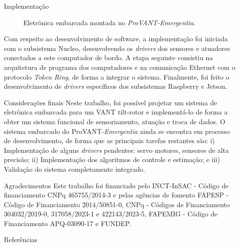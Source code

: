 \documentclass[final,20pt]{beamer}
\newlength{\sepwidth}
\newlength{\colwidth}
\newcommand{\separatorcolumn}{\begin{column}{\sepwidth}\end{column}}
\begin{document}
\begin{frame}[t]
\begin{columns}[t]
\begin{column}{\colwidth}
\begin{block}{Implementação}
\begin{figure}
        \caption{Eletrônica embarcada montada no \textit{ProVANT-Emergentia}.}
        \label{fig:vant4}
    \end{figure}

    Com respeito ao desenvolvimento de software, a implementação foi iniciada com o subsistema Nucleo, desenvolvendo os \textit{drivers} dos sensores e atuadores conectados a este computador de bordo. A etapa seguinte consistiu na arquitetura de programa dos computadores e na comunicação Ethernet com o protocolo \textit{Token Ring}, de forma a integrar o sistema. Finalmente, foi feito o desenvolvimento de \textit{drivers} específicos dos subsistemas Raspberry e Jetson.

  \end{block}
\vspace{-1em}
  \begin{block}{Considerações finais}
   Neste trabalho, foi possível projetar um sistema de eletrônica embarcada para um VANT tilt-rotor e implementá-lo de forma a obter um sistema funcional de sensoriamento, atuação e troca de dados. O sistema embarcado do ProVANT-\textit{Emergentia} ainda se encontra em processo de desenvolvimento, de forma que as principais tarefas restantes são: i) Implementação de alguns \textit{drivers} pendentes: servo motores, sensores de alta precisão; ii) Implementação dos algoritmos de controle e estimação; e iii) Validação do sistema completamente integrado.
  \end{block}
  \vspace{-1em}
  \begin{block}{Agradecimentos}
    {\small
    Este trabalho foi financiado pelo INCT-InSAC - Código de financiamento CNPq 465755/2014-3 e pelas agências de fomento FAPESP - Código de Financiamento 2014/50851-0, CNPq - Códigos de Financiamento 304032/2019-0, 317058/2023-1 e 422143/2023-5, FAPEMIG - Código de Financiamento APQ-03090-17 e FUNDEP.}      
  \end{block}
  \vspace{-1em}
  \begin{block}{Referências}
    \nocite{*}
    \vspace{-0.3em}
    {\small
    
    }
  \end{block}

\end{column}
\separatorcolumn



\end{columns}
\end{frame}
\end{document}
